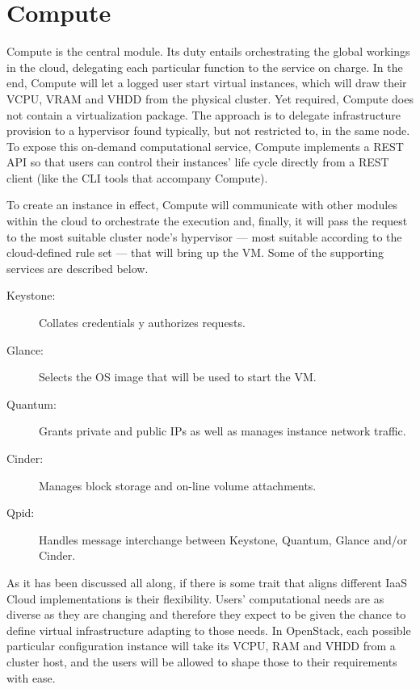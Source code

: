 \section{Compute}\label{sec:compute}

\noindent Compute is the central module. Its duty entails orchestrating the global workings in the cloud, delegating each particular function to the service on charge. In the end, Compute will let a logged user start virtual instances, which will draw their VCPU, VRAM and VHDD from the physical cluster. Yet required, Compute does not contain a virtualization package. The approach is to delegate infrastructure provision to a hypervisor found typically, but not restricted to, in the same node. To expose this on-demand computational service, Compute implements a REST API so that users can control their instances' life cycle directly from a REST client (like the CLI tools that accompany Compute).

To create an instance in effect, Compute will communicate with other modules within the cloud to orchestrate the execution and, finally, it will pass the request to the most suitable cluster node's hypervisor --- most suitable according to the cloud-defined rule set --- that will bring up the VM. Some of the supporting services are described below.

\begin{description}
 \item[Keystone:] Collates credentials y authorizes requests.
 \item[Glance:] Selects the OS image that will be used to start the VM.
 \item[Quantum:] Grants private and public IPs as well as manages instance network traffic.
 \item[Cinder:] Manages block storage and on-line volume attachments.
 \item[Qpid:] Handles message interchange between Keystone, Quantum, Glance and/or Cinder.
\end{description}

As it has been discussed all along, if there is some trait that aligns different IaaS Cloud implementations is their flexibility. Users' computational needs are as diverse as they are changing and therefore they expect to be given the chance to define virtual infrastructure adapting to those needs. In OpenStack, each possible particular configuration instance will take its VCPU, RAM and VHDD from a cluster host, and the users will be allowed to shape those to their requirements with ease.

